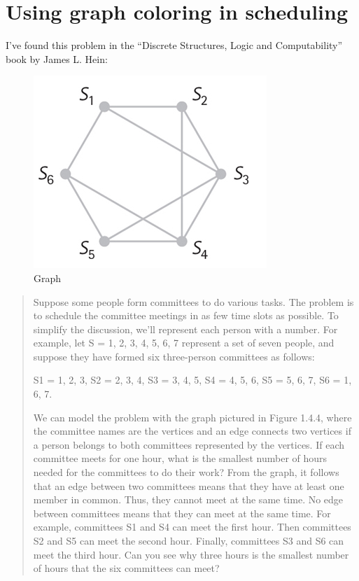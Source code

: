 \section{Using graph coloring in scheduling}

I've found this problem in the ``Discrete Structures, Logic and Computability'' book by James L. Hein:

\begin{figure}[H]
\centering
\includegraphics[scale=0.75]{color/fig144.png}
\caption{Graph}
\end{figure}

\begin{framed}
\begin{quotation}
Suppose some people form committees to do various tasks. The problem is to schedule the committee meetings in as few time slots as possible.
To simplify the discussion, we’ll represent each person with a number. For example, let S = {1, 2, 3, 4, 5, 6, 7} represent a set of seven people, and suppose they have formed six three-person committees as follows:

S1 = {1, 2, 3}, S2 = {2, 3, 4}, S3 = {3, 4, 5}, S4 = {4, 5, 6}, S5 = {5, 6, 7}, S6 = {1, 6, 7}.

We can model the problem with the graph pictured in Figure 1.4.4, where the committee names are the vertices and an edge connects two vertices if a person belongs to both committees represented by the vertices.
If each committee meets for one hour, what is the smallest number of hours needed for the committees to do their work?
From the graph, it follows that an edge between two committees means that they have at least one member in common.
Thus, they cannot meet at the same time. No edge between committees means that they can meet at the same time.
For example, committees S1 and S4 can meet the first hour. Then committees S2 and S5 can meet the second hour.
Finally, committees S3 and S6 can meet the third hour. Can you see why three hours is the smallest number of hours that the six committees can meet?
\end{quotation}
\end{framed}


